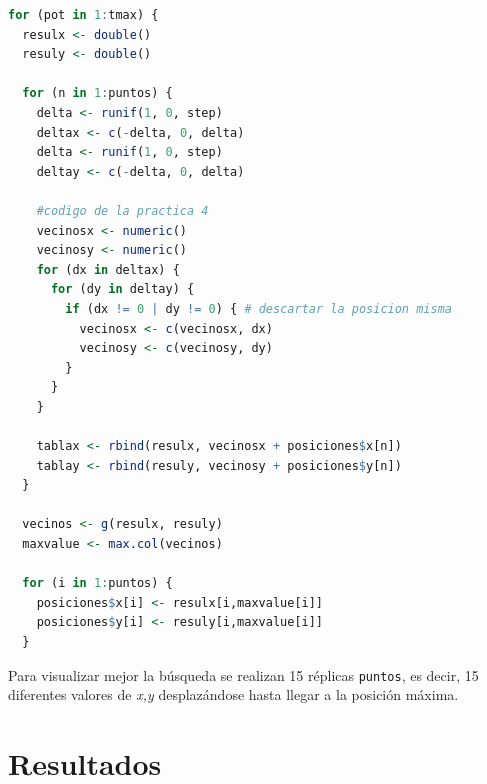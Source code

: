 \documentclass{article}
\begin{document}
\begin{lstlisting}[language=R]
for (pot in 1:tmax) {
  resulx <- double()
  resuly <- double()
  
  for (n in 1:puntos) {
    delta <- runif(1, 0, step)
    deltax <- c(-delta, 0, delta)
    delta <- runif(1, 0, step)
    deltay <- c(-delta, 0, delta)
    
    #codigo de la practica 4
    vecinosx <- numeric()
    vecinosy <- numeric()
    for (dx in deltax) {
      for (dy in deltay) {
        if (dx != 0 | dy != 0) { # descartar la posicion misma
          vecinosx <- c(vecinosx, dx)
          vecinosy <- c(vecinosy, dy)
        }
      }
    }
    
    tablax <- rbind(resulx, vecinosx + posiciones$x[n])
    tablay <- rbind(resuly, vecinosy + posiciones$y[n])
  }
  
  vecinos <- g(resulx, resuly)
  maxvalue <- max.col(vecinos)
  
  for (i in 1:puntos) {
    posiciones$x[i] <- resulx[i,maxvalue[i]]
    posiciones$y[i] <- resuly[i,maxvalue[i]]
  }
\end{lstlisting}

Para visualizar mejor la búsqueda se realizan 15 réplicas \texttt{puntos}, es decir, 15 diferentes valores de \textit{x,y} desplazándose hasta llegar a la posición máxima.
\newpage


\section{Resultados}
\end{document}
